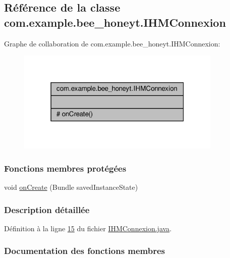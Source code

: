 \hypertarget{classcom_1_1example_1_1bee__honeyt_1_1_i_h_m_connexion}{}\subsection{Référence de la classe com.\+example.\+bee\+\_\+honeyt.\+I\+H\+M\+Connexion}
\label{classcom_1_1example_1_1bee__honeyt_1_1_i_h_m_connexion}


Graphe de collaboration de com.\+example.\+bee\+\_\+honeyt.\+I\+H\+M\+Connexion\+:\nopagebreak
\begin{figure}[H]
\begin{center}
\leavevmode
\includegraphics[width=277pt]{classcom_1_1example_1_1bee__honeyt_1_1_i_h_m_connexion__coll__graph}
\end{center}
\end{figure}
\subsubsection*{Fonctions membres protégées}
\begin{DoxyCompactItemize}
\item 
void \hyperlink{classcom_1_1example_1_1bee__honeyt_1_1_i_h_m_connexion_a4949c5484f6719c377d94a4a88143fb9}{on\+Create} (Bundle saved\+Instance\+State)
\end{DoxyCompactItemize}


\subsubsection{Description détaillée}


Définition à la ligne \hyperlink{_i_h_m_connexion_8java_source_l00015}{15} du fichier \hyperlink{_i_h_m_connexion_8java_source}{I\+H\+M\+Connexion.\+java}.



\subsubsection{Documentation des fonctions membres}
\mbox{\label{classcom_1_1example_1_1bee__honeyt_1_1_i_h_m_connexion_a4949c5484f6719c377d94a4a88143fb9}} 
